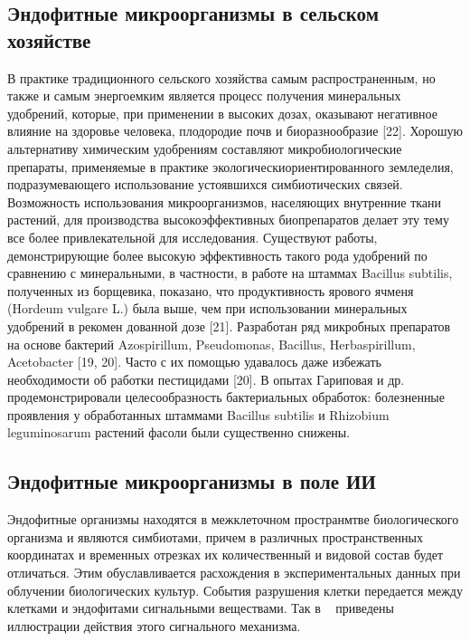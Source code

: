 \documentclass[11pt]{article}
\begin{document}
\subsection{Эндофитные микроорганизмы в сельском хозяйстве}
В практике традиционного сельского хозяйства самым распространенным, но также и самым энергоемким
является процесс получения минеральных удобрений, которые, при применении в высоких дозах, оказывают негативное влияние на здоровье человека, плодородие почв и биоразнообразие [22]. Хорошую альтернативу химическим удобрениям составляют микробиологические
препараты, применяемые в практике экологическиориентированного земледелия, подразумевающего использование устоявшихся симбиотических связей. Возможность использования микроорганизмов, населяющих внутренние ткани растений, для производства высокоэффективных биопрепаратов делает эту тему все более привлекательной для исследования. Существуют работы, демонстрирующие более высокую эффективность такого рода удобрений по сравнению с минеральными, в частности, в работе на штаммах Bacillus subtilis, полученных из борщевика, показано, что продуктивность
ярового ячменя (Hordeum vulgare L.) была выше, чем при использовании минеральных удобрений в рекомен дованной дозе [21]. Разработан ряд микробных препаратов на основе бактерий Azospirillum, Pseudomonas, Bacillus, Herbaspirillum, Acetobacter [19, 20]. Часто с их помощью удавалось даже избежать необходимости об работки пестицидами [20]. В опытах Гариповая и др. продемонстрировали целесообразность бактериальных обработок: болезненные проявления у обработанных штаммами Bacillus subtilis и Rhizobium leguminosarum растений фасоли были существенно снижены.

\subsection{Эндофитные микроорганизмы в поле ИИ}
Эндофитные организмы находятся в межклеточном пространмтве биологического организма и являются симбиотами, причем в различных пространственных координатах и временных отрезках их количественный и видовой состав будет отличаться. Этим обуславливается расхождения в экспериментальных данных при облучении биологических культур. События разрушения клетки передается между клетками и эндофитами сигнальными веществами. Так в ~\cite{Prise,Dong} приведены иллюстрации действия этого сигнального механизма.
\end{document}
